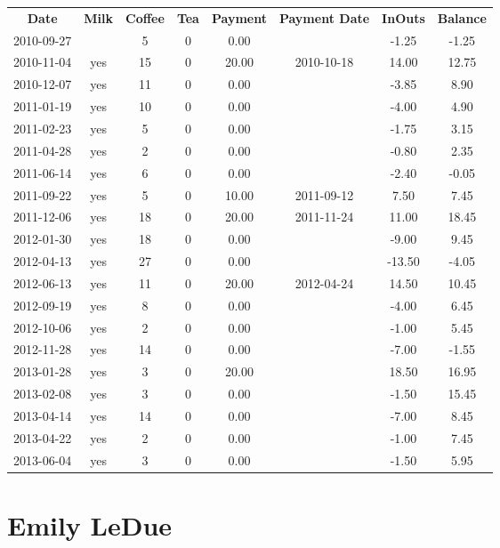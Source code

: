 \begin{center}
\begin{tabular}{cccccccc}
\textbf{Date} & \textbf{Milk} & \textbf{Coffee} & \textbf{Tea} & \textbf{Payment} & \textbf{Payment Date} & \textbf{InOuts} & \textbf{Balance} \\
2010-09-27 &  &  5 & 0 &  0.00 &  &  -1.25 & -1.25\\ 
2010-11-04 & yes & 15 & 0 & 20.00 & 2010-10-18 &  14.00 & 12.75\\ 
2010-12-07 & yes & 11 & 0 &  0.00 &  &  -3.85 &  8.90\\ 
2011-01-19 & yes & 10 & 0 &  0.00 &  &  -4.00 &  4.90\\ 
2011-02-23 & yes &  5 & 0 &  0.00 &  &  -1.75 &  3.15\\ 
2011-04-28 & yes &  2 & 0 &  0.00 &  &  -0.80 &  2.35\\ 
2011-06-14 & yes &  6 & 0 &  0.00 &  &  -2.40 & -0.05\\ 
2011-09-22 & yes &  5 & 0 & 10.00 & 2011-09-12 &   7.50 &  7.45\\ 
2011-12-06 & yes & 18 & 0 & 20.00 & 2011-11-24 &  11.00 & 18.45\\ 
2012-01-30 & yes & 18 & 0 &  0.00 &  &  -9.00 &  9.45\\ 
2012-04-13 & yes & 27 & 0 &  0.00 &  & -13.50 & -4.05\\ 
2012-06-13 & yes & 11 & 0 & 20.00 & 2012-04-24 &  14.50 & 10.45\\ 
2012-09-19 & yes &  8 & 0 &  0.00 &  &  -4.00 &  6.45\\ 
2012-10-06 & yes &  2 & 0 &  0.00 &  &  -1.00 &  5.45\\ 
2012-11-28 & yes & 14 & 0 &  0.00 &  &  -7.00 & -1.55\\ 
2013-01-28 & yes &  3 & 0 & 20.00 &  &  18.50 & 16.95\\ 
2013-02-08 & yes &  3 & 0 &  0.00 &  &  -1.50 & 15.45\\ 
2013-04-14 & yes & 14 & 0 &  0.00 &  &  -7.00 &  8.45\\ 
2013-04-22 & yes &  2 & 0 &  0.00 &  &  -1.00 &  7.45\\ 
2013-06-04 & yes &  3 & 0 &  0.00 &  &  -1.50 &  5.95
\end{tabular}
\end{center}

\section{Emily LeDue}

